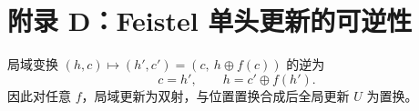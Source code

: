 \section{附录 D：Feistel 单头更新的可逆性}

局域变换 $(h,c)\mapsto(h',c')=(c,\ h\oplus f(c))$ 的逆为
\[
c=h',\qquad h=c'\oplus f(h').
\]
因此对任意 $f$，局域更新为双射，与位置置换合成后全局更新 $U$ 为置换。

